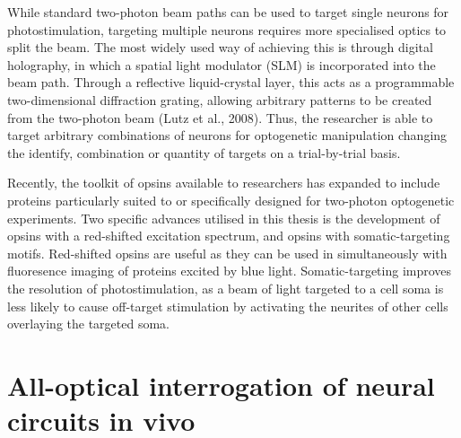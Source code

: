 While standard two-photon beam paths can be used to target single neurons for photostimulation, targeting multiple neurons requires more specialised optics to split the beam. The most widely used way of achieving this is through digital holography, in which a spatial light modulator (SLM) 	is incorporated into the beam path. Through a reflective liquid-crystal layer, this acts as a programmable two-dimensional diffraction grating, allowing arbitrary patterns to be created from the two-photon beam (Lutz et al., 2008). Thus, the researcher is able to target arbitrary combinations of neurons for optogenetic manipulation changing the identify, combination or quantity of targets on a trial-by-trial basis. 

Recently, the toolkit of opsins available to researchers has expanded to include proteins particularly suited to \cite{yizhar_neocortical_2011} or specifically designed for \cite{chettih_single-neuron_2019, mardinly_precise_2018, marshel_cortical_2019} two-photon optogenetic experiments. Two specific advances utilised in this thesis is the development of opsins with a red-shifted excitation spectrum, and opsins with somatic-targeting motifs. Red-shifted opsins are useful as they can be used in simultaneously with fluoresence imaging of proteins excited by blue light. Somatic-targeting improves the resolution of photostimulation, as a beam of light targeted to a cell soma is less likely to cause off-target stimulation by activating the neurites of other cells overlaying the targeted soma.

\section{All-optical interrogation of neural circuits in vivo}
 
